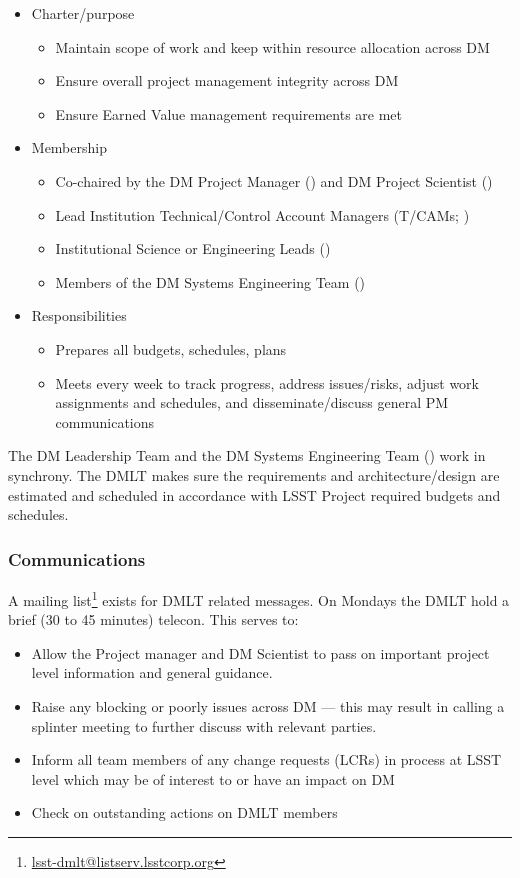 \begin{itemize}
\item Charter/purpose
	\begin{itemize}
	\item Maintain scope of work and keep within resource allocation across DM
	\item Ensure overall project management integrity across DM
	\item Ensure Earned Value management requirements are met
	\end{itemize}
\item Membership
	\begin{itemize}
	\item Co-chaired by the DM Project Manager () and DM Project Scientist ()
	\item Lead Institution Technical/Control Account Managers (T/CAMs; )
	\item Institutional Science or Engineering Leads ()
	\item Members of the DM Systems Engineering Team ()
	\end{itemize}
\item Responsibilities
	\begin{itemize}
	\item Prepares all budgets, schedules, plans
	\item Meets every week to track progress, address issues/risks, adjust work assignments and schedules, and disseminate/discuss general PM communications
	\end{itemize}
\end{itemize}

The DM Leadership Team and the DM Systems Engineering Team () work in synchrony.
The DMLT makes sure the requirements and architecture/design are estimated and scheduled in accordance with LSST Project required budgets and schedules.

 \subsubsection{Communications}
A mailing list\footnote{\url{lsst-dmlt@listserv.lsstcorp.org}} exists for DMLT related messages.
On Mondays the DMLT hold a brief (30 to 45 minutes) telecon. This serves to:

\begin{itemize}
\item Allow the Project manager and DM Scientist  to pass on important project level information and general guidance.
\item Raise any blocking or poorly issues across DM --- this may result in calling a splinter meeting to further discuss with relevant parties.
\item Inform all team members of any change requests (LCRs) in process at LSST level which may be of interest to or have an impact on DM
\item Check on outstanding actions on DMLT members
\end{itemize}

